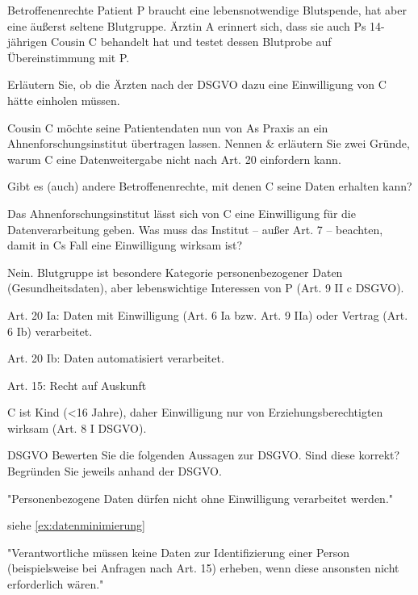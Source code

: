 \documentclass{exercisesheet}
\begin{document}
\begin{eexercises}{Betroffenenrechte}{
    Patient P braucht eine lebensnotwendige Blutspende, hat aber eine äußerst seltene Blutgruppe. Ärztin A erinnert sich, dass sie auch Ps 14-jährigen Cousin C behandelt hat und testet dessen Blutprobe auf Übereinstimmung mit P.
  }
  \item Erläutern Sie, ob die Ärzten nach der DSGVO dazu eine Einwilligung von C hätte einholen müssen.
  \item Cousin C möchte seine Patientendaten nun von As Praxis an ein Ahnenforschungsinstitut übertragen lassen. Nennen \& erläutern Sie zwei Gründe, warum C eine Datenweitergabe nicht nach Art. 20 einfordern kann.
  \item Gibt es (auch) andere Betroffenenrechte, mit denen C seine Daten erhalten kann?
  \item Das Ahnenforschungsinstitut lässt sich von C eine Einwilligung für die Datenverarbeitung geben. Was muss das Institut – außer Art. 7 – beachten, damit in Cs Fall eine Einwilligung wirksam ist?
\end{eexercises}

\begin{solutions}
  \item Nein. Blutgruppe ist besondere Kategorie personenbezogener Daten (Gesundheitsdaten), aber lebenswichtige Interessen von P (Art. 9 II c DSGVO).
  \item Art. 20 Ia: Daten mit Einwilligung (Art. 6 Ia bzw. Art. 9 IIa) oder Vertrag (Art. 6 Ib) verarbeitet.\xmark\par
  Art. 20 Ib: Daten automatisiert verarbeitet. \xmark
  \item Art. 15: Recht auf Auskunft
  \item C ist Kind (<16 Jahre), daher Einwilligung nur von Erziehungsberechtigten wirksam (Art. 8 I DSGVO).
\end{solutions}

\begin{eexercises}{DSGVO}{
    Bewerten Sie die folgenden Aussagen zur DSGVO. Sind diese korrekt? Begründen Sie jeweils anhand der DSGVO.
  }
  \item "Personenbezogene Daten dürfen nicht ohne Einwilligung verarbeitet werden."
  \item siehe \ref{ex:datenminimierung}
  \item "Verantwortliche müssen keine Daten zur Identifizierung einer Person (beispielsweise bei Anfragen nach Art. 15) erheben, wenn diese ansonsten nicht erforderlich wären."
\end{eexercises}
\end{document}
